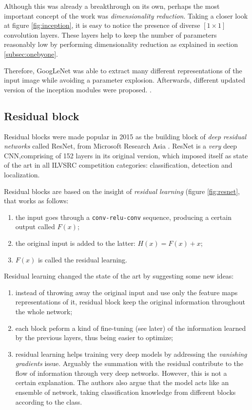 Although this was already a breakthrough on its own, perhaps the most important concept of the work was \emph{dimensionality reduction}. Taking a closer look at figure \ref{fig:inception}, it is easy to notice the presence of diverse $[1 \times 1]$ convolution layers. These layers help to keep the number of parameters reasonably low by performing dimensionality reduction as explained in section \ref{subsec:onebyone}. 

Therefore, GoogLeNet was able to extract many different representations of the input image while avoiding a parameter explosion. Afterwards, different updated version of the inception modules were proposed. \parencite{inception3} \parencite{inception4}.

\subsection{Residual block}
Residual blocks were made popular in 2015 as the building block of \emph{deep residual networks} called ResNet, from Microsoft Research Asia \parencite{resnet}. ResNet is a \emph{very} deep CNN,comprising of 152 layers in its original version, which imposed itself as state of the art in all ILVSRC competition categories: classification, detection and localization. 
\newline 

Residual blocks are based on the insight of \emph{residual learning} (figure \ref{fig:resnet}, that works as follows: 
\begin{enumerate}
    \item the input goes through a \texttt{conv-relu-conv} sequence, producing a certain output called $F(x)$; 
    
    \item the original input is added to the latter: $H(x) = F(x) + x $; 
    
    \item $F(x)$ is called the residual learning. 
\end{enumerate}

Residual learning changed the state of the art by suggesting some new ideas: 
\begin{enumerate}
    \item instead of throwing away the original input and use only the feature maps representations of it, residual block keep the original information throughout the whole network; 
    
    \item each block peform a kind of fine-tuning (see later) of the information learned by the previous layers, thus being easier to optimize; 
    
    \item residual learning helps training very deep models by addressing the  \emph{vanishing gradients} issue. Arguably the summation with the residual contribute to the flow of information through very deep networks. However, this is not a certain explanation. The authors also argue that the model acts like an ensemble of network, taking classification knowledge from different blocks according to the class. 
    
\end{enumerate}


